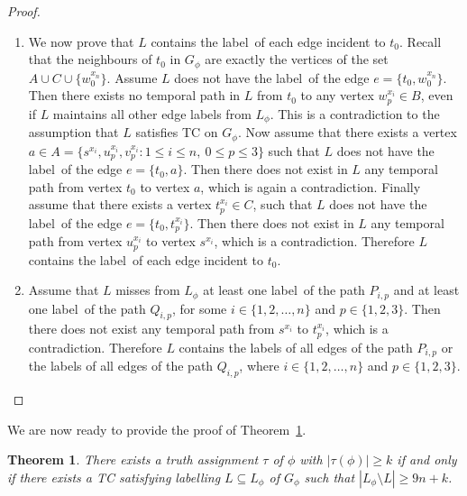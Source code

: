 \documentclass[a4paper,UKenglish]{article}
\newtheorem{theorem}{Theorem}
\begin{document}
\begin{proof}
\begin{enumerate}[label=(\alph*)]
\item We now prove that $L$ contains the label~of each edge
incident to $t_{0}$. Recall that the neighbours of $t_{0}$ in $G_{\phi }$ are
exactly the vertices of the set $A\cup C\cup \{w_{0}^{x_{n}}\}$. Assume $L $ does not have the label~of the edge $e= \{ t_{0}  ,   w_{0}^{x_{n}}   \}  $. Then
there exists no temporal path in $L $ from $t_{0}$ to any vertex $w_{p}^{x_{i}}\in B$, even if $L $ maintains all other edge labels from 
$L _{\phi }$. This is a contradiction to the assumption that $L $
satisfies TC on $G_{\phi }$. Now assume that there exists a
vertex $a\in A=\{s^{x_{i}},u_{p}^{x_{i}},v_{p}^{x_{i}}:1\leq i\leq n,\ 0\leq
p\leq 3\}$ such that $L $ does not have the label~of the edge $e=  \{  t_{0}  ,  a  \}
$. Then there does not exist in $L $ any temporal path from vertex $t_{0}$ to vertex $a$, which is again a contradiction. Finally assume that
there exists a vertex $t_{p}^{x_{i}}\in C$, such that $L $ does not
have the label~of the edge $e=  \{ t_{0}  ,  t_{p}^{x_{i}}  \}  $. Then there does not exist
in $L $ any temporal path from vertex $u_{p}^{x_{i}}$ to vertex $s^{x_{i}}$, which is a contradiction. Therefore $L $ contains the
label~of each edge incident to $t_{0}$.

\item Assume that $L $ misses from $L _{\phi }$ at least
one label~of the path $P_{i,p}$ and at least one label~of the path $Q_{i,p}$, for some $i\in \{1,2,\ldots ,n\}$ and $p\in \{1,2,3\}$. Then there does
not exist any temporal path from $s^{x_{i}}$ to $t_{p}^{x_{i}}$, which is a
contradiction. Therefore $L $ contains the labels of all edges of the
path $P_{i,p}$ or the labels of all edges of the path $Q_{i,p}$, where $i\in
\{1,2,\ldots ,n\}$ and $p\in \{1,2,3\}$.
\end{enumerate}
\end{proof}


We are now ready to provide the proof of Theorem~\ref{cost-removing-labels-upper-lower-bound-thm}.

\begin{theorem}
\label{cost-removing-labels-upper-lower-bound-thm}
There exists a truth assignment $\tau $ of $\phi $ with $|\tau (\phi )|\geq k$ if and only if there exists a TC satisfying labelling $L\subseteq L_{\phi}$ of $G_{\phi}$ such that $|L_{\phi} \setminus L|\geq 9n+k$.
\end{theorem}
\end{document}
